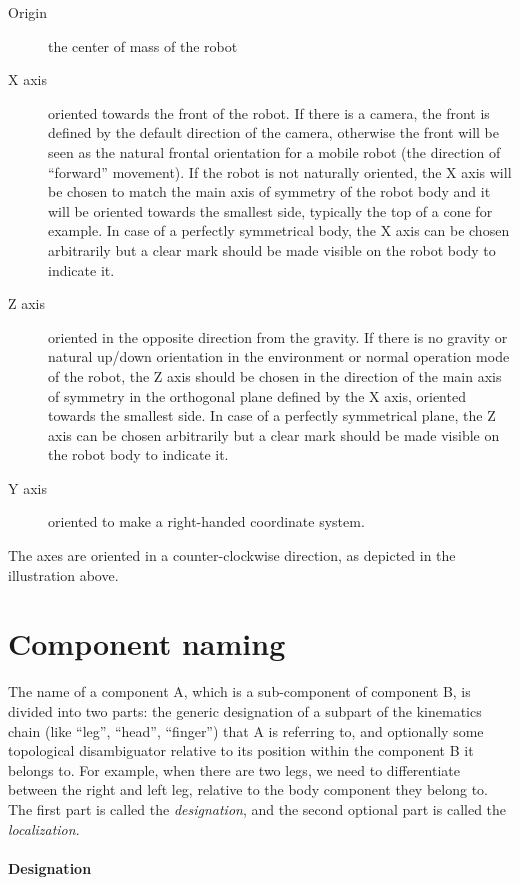 \begin{description}
\item[Origin] the center of mass of the robot
\item[X axis] oriented towards the front of the robot. If there is a
  camera, the front is defined by the default direction of the camera,
  otherwise the front will be seen as the natural frontal orientation
  for a mobile robot (the direction of ``forward'' movement). If the
  robot is not naturally oriented, the X axis will be chosen to match
  the main axis of symmetry of the robot body and it will be oriented
  towards the smallest side, typically the top of a cone for
  example. In case of a perfectly symmetrical body, the X axis can be
  chosen arbitrarily but a clear mark should be made visible on the
  robot body to indicate it.
\item[Z axis] oriented in the opposite direction from the gravity. If
  there is no gravity or natural up/down orientation in the
  environment or normal operation mode of the robot, the Z axis should
  be chosen in the direction of the main axis of symmetry in the
  orthogonal plane defined by the X axis, oriented towards the
  smallest side. In case of a perfectly symmetrical plane, the Z axis
  can be chosen arbitrarily but a clear mark should be made visible on
  the robot body to indicate it.
\item[Y axis] oriented to make a right-handed coordinate system.
\end{description}


The axes are oriented in a counter-clockwise direction, as depicted in
the illustration above.

\section{Component naming}

The name of a component A, which is a sub-component of component B, is
divided into two parts: the generic designation of a subpart of the
kinematics chain (like ``leg'', ``head'', ``finger'') that A is referring
to, and optionally some topological disambiguator relative to its
position within the component B it belongs to. For example, when there
are two legs, we need to differentiate between the right and left leg,
relative to the body component they belong to. The first part is
called the \textit{designation}, and the second optional part is
called the \textit{localization}.

\paragraph{Designation}


